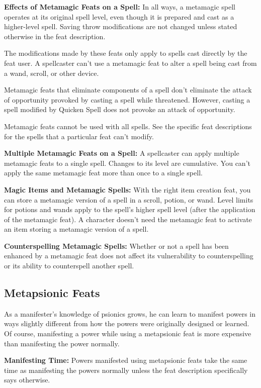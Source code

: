 \textbf{Effects of Metamagic Feats on a Spell:} In all ways, a metamagic spell operates at its original spell level, even though it is prepared and cast as a higher-level spell. Saving throw modifications are not changed unless stated otherwise in the feat description.

The modifications made by these feats only apply to spells cast directly by the feat user. A spellcaster can't use a metamagic feat to alter a spell being cast from a wand, scroll, or other device.

Metamagic feats that eliminate components of a spell don't eliminate the attack of opportunity provoked by casting a spell while threatened. However, casting a spell modified by Quicken Spell does not provoke an attack of opportunity.

Metamagic feats cannot be used with all spells. See the specific feat descriptions for the spells that a particular feat can't modify.

\textbf{Multiple Metamagic Feats on a Spell:} A spellcaster can apply multiple metamagic feats to a single spell. Changes to its level are cumulative. You can't apply the same metamagic feat more than once to a single spell.

\textbf{Magic Items and Metamagic Spells:} With the right item creation feat, you can store a metamagic version of a spell in a scroll, potion, or wand. Level limits for potions and wands apply to the spell's higher spell level (after the application of the metamagic feat). A character doesn't need the metamagic feat to activate an item storing a metamagic version of a spell.

\textbf{Counterspelling Metamagic Spells:} Whether or not a spell has been enhanced by a metamagic feat does not affect its vulnerability to counterspelling or its ability to counterspell another spell.

\subsection{Metapsionic Feats}
As a manifester's knowledge of psionics grows, he can learn to manifest powers in ways slightly different from how the powers were originally designed or learned. Of course, manifesting a power while using a metapsionic feat is more expensive than manifesting the power normally.

\textbf{Manifesting Time:} Powers manifested using metapsionic feats take the same time as manifesting the powers normally unless the feat description specifically says otherwise.

